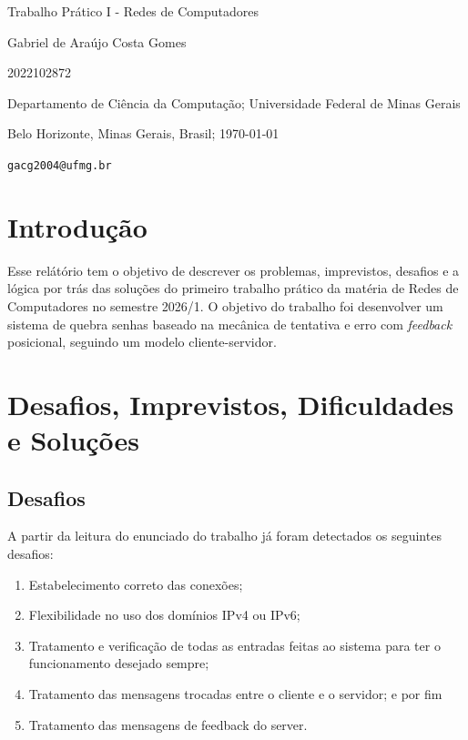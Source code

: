 \documentclass{article}
\begin{document}
	\begin{center}
		{\Large {Trabalho Prático I - Redes de Computadores}}
		
		\vspace{.2cm}
		
		{Gabriel de Araújo Costa Gomes}

        {2022102872}
		
		\vspace{.2cm}
		
		Departamento de Ciência da Computação; Universidade Federal de Minas Gerais
		
		Belo Horizonte, Minas Gerais, Brasil; {\today}

        \texttt{gacg2004@ufmg.br}
		
	\end{center}

    \section{Introdução}

        \hspace{0.5cm}Esse relátório tem o objetivo de descrever os problemas, imprevistos, desafios e a lógica por trás das soluções do primeiro trabalho prático
        da matéria de Redes de Computadores no semestre 2026/1. O objetivo do trabalho foi desenvolver um sistema de quebra senhas
        baseado na mecânica de tentativa e erro com \textit{feedback} posicional, seguindo um modelo cliente-servidor.

    \section{Desafios, Imprevistos, Dificuldades e Soluções}
        \subsection{Desafios}
        A partir da leitura do enunciado do trabalho já foram detectados os seguintes desafios:

        \begin{enumerate}
            \item Estabelecimento correto das conexões;
            \item Flexibilidade no uso dos domínios IPv4 ou IPv6;
            \item Tratamento e verificação de todas as entradas feitas ao sistema para ter o funcionamento desejado sempre;
            \item Tratamento das mensagens trocadas entre o cliente e o servidor; e por fim
            \item Tratamento das mensagens de feedback do server.
        \end{enumerate}
\end{document}
